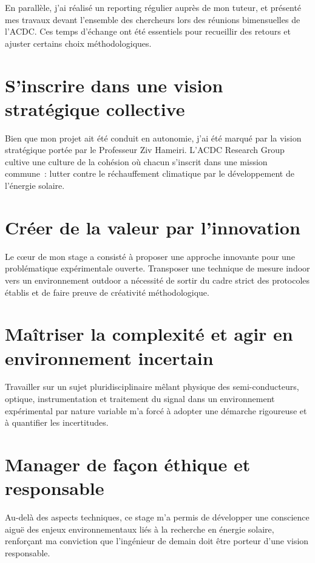 \documentclass[12pt,a4paper]{report}
\begin{document}
En parallèle, j'ai réalisé un reporting régulier auprès de mon tuteur, et présenté mes travaux devant l'ensemble des chercheurs lors des réunions bimensuelles de l'ACDC. Ces temps d'échange ont été essentiels pour recueillir des retours et ajuster certains choix méthodologiques.

\section{S'inscrire dans une vision stratégique collective}

Bien que mon projet ait été conduit en autonomie, j'ai été marqué par la vision stratégique portée par le Professeur Ziv Hameiri. L'ACDC Research Group cultive une culture de la cohésion où chacun s'inscrit dans une mission commune~: lutter contre le réchauffement climatique par le développement de l'énergie solaire.

\section{Créer de la valeur par l'innovation}

Le c\oe ur de mon stage a consisté à proposer une approche innovante pour une problématique expérimentale ouverte. Transposer une technique de mesure indoor vers un environnement outdoor a nécessité de sortir du cadre strict des protocoles établis et de faire preuve de créativité méthodologique.

\section{Maîtriser la complexité et agir en environnement incertain}

Travailler sur un sujet pluridisciplinaire mêlant physique des semi-conducteurs, optique, instrumentation et traitement du signal dans un environnement expérimental par nature variable m'a forcé à adopter une démarche rigoureuse et à quantifier les incertitudes.

\section{Manager de façon éthique et responsable}

Au-delà des aspects techniques, ce stage m'a permis de développer une conscience aiguë des enjeux environnementaux liés à la recherche en énergie solaire, renforçant ma conviction que l'ingénieur de demain doit être porteur d'une vision responsable.
\end{document}
